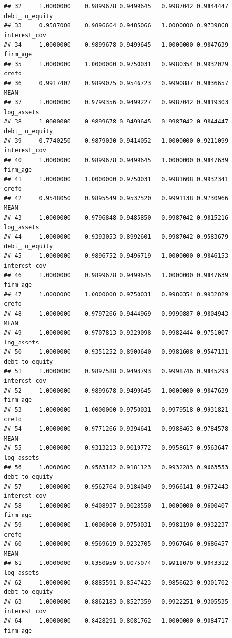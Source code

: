\documentclass[
]{article}
\begin{document}
\begin{verbatim}
## 32     1.0000000    0.9899678 0.9499645   0.9987042 0.9844447 debt_to_equity
## 33     0.9587008    0.9896664 0.9485066   1.0000000 0.9739868   interest_cov
## 34     1.0000000    0.9899678 0.9499645   1.0000000 0.9847639       firm_age
## 35     1.0000000    1.0000000 0.9750031   0.9980354 0.9932029          crefo
## 36     0.9917402    0.9899075 0.9546723   0.9990887 0.9836657           MEAN
## 37     1.0000000    0.9799356 0.9499227   0.9987042 0.9819303     log_assets
## 38     1.0000000    0.9899678 0.9499645   0.9987042 0.9844447 debt_to_equity
## 39     0.7740250    0.9879030 0.9414052   1.0000000 0.9211099   interest_cov
## 40     1.0000000    0.9899678 0.9499645   1.0000000 0.9847639       firm_age
## 41     1.0000000    1.0000000 0.9750031   0.9981608 0.9932341          crefo
## 42     0.9548050    0.9895549 0.9532520   0.9991138 0.9730966           MEAN
## 43     1.0000000    0.9796848 0.9485850   0.9987042 0.9815216     log_assets
## 44     1.0000000    0.9393053 0.8992601   0.9987042 0.9583679 debt_to_equity
## 45     1.0000000    0.9896752 0.9496719   1.0000000 0.9846153   interest_cov
## 46     1.0000000    0.9899678 0.9499645   1.0000000 0.9847639       firm_age
## 47     1.0000000    1.0000000 0.9750031   0.9980354 0.9932029          crefo
## 48     1.0000000    0.9797266 0.9444969   0.9990887 0.9804943           MEAN
## 49     1.0000000    0.9707813 0.9329098   0.9982444 0.9751007     log_assets
## 50     1.0000000    0.9351252 0.8900640   0.9981608 0.9547131 debt_to_equity
## 51     1.0000000    0.9897588 0.9493793   0.9998746 0.9845293   interest_cov
## 52     1.0000000    0.9899678 0.9499645   1.0000000 0.9847639       firm_age
## 53     1.0000000    1.0000000 0.9750031   0.9979518 0.9931821          crefo
## 54     1.0000000    0.9771266 0.9394641   0.9988463 0.9784578           MEAN
## 55     1.0000000    0.9313213 0.9019772   0.9958617 0.9563647     log_assets
## 56     1.0000000    0.9563182 0.9181123   0.9932283 0.9663553 debt_to_equity
## 57     1.0000000    0.9562764 0.9184049   0.9966141 0.9672443   interest_cov
## 58     1.0000000    0.9408937 0.9028550   1.0000000 0.9600407       firm_age
## 59     1.0000000    1.0000000 0.9750031   0.9981190 0.9932237          crefo
## 60     1.0000000    0.9569619 0.9232705   0.9967646 0.9686457           MEAN
## 61     1.0000000    0.8350959 0.8075074   0.9918070 0.9043312     log_assets
## 62     1.0000000    0.8885591 0.8547423   0.9856623 0.9301702 debt_to_equity
## 63     1.0000000    0.8862183 0.8527359   0.9922251 0.9305535   interest_cov
## 64     1.0000000    0.8428291 0.8081762   1.0000000 0.9084717       firm_age

\end{verbatim}
\end{document}
